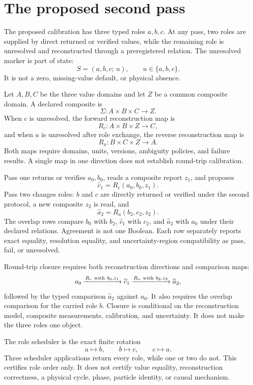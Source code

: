 \section{The proposed second pass}

The proposed calibration has three typed roles \(a,b,c\).  At any pass, two roles are supplied by direct returned or
verified values, while the remaining role is unresolved and reconstructed through a preregistered relation.  The
unresolved marker is part of state:
\[
                         S=(a,b,c;\,u),\qquad u\in\{a,b,c\}.
\]
It is not a zero, missing-value default, or physical absence.

Let \(A,B,C\) be the three value domains and let \(Z\) be a common composite domain.  A declared composite is
\[
                         \Sigma:A\times B\times C\to Z.
\]
When \(c\) is unresolved, the forward reconstruction map is
\[
                         R_c:A\times B\times Z\to C,
\]
and when \(a\) is unresolved after role exchange, the reverse reconstruction map is
\[
                         R_a:B\times C\times Z\to A.
\]
Both maps require domains, units, versions, ambiguity policies, and failure results.  A single map in one direction
does not establish round-trip calibration.

Pass one returns or verifies \(a_0,b_0\), reads a composite report \(z_1\), and proposes
\[
                         \widehat c_1=R_c(a_0,b_0,z_1).
\]
Pass two changes roles: \(b\) and \(c\) are directly returned or verified under the second protocol, a new composite
\(z_2\) is read, and
\[
                         \widehat a_2=R_a(b_2,c_2,z_2).
\]
The overlap rows compare \(b_0\) with \(b_2\), \(\widehat c_1\) with \(c_2\), and \(\widehat a_2\) with \(a_0\) under
their declared relations.  Agreement is not one Boolean.  Each row separately reports exact equality, resolution
equality, and uncertainty-region compatibility as pass, fail, or unresolved.

Round-trip closure requires both reconstruction directions and comparison maps:
\[
                         a_0\xrightarrow{R_c\ {\rm with}\ b_0,z_1}\widehat c_1
\xrightarrow{R_a\ {\rm with}\ b_2,z_2}\widehat a_2,
\]
followed by the typed comparison \(\widehat a_2\) against \(a_0\).  It also requires the overlap comparison for the
carried role \(b\).  Closure is conditional on the reconstruction model, composite measurements, calibration, and
uncertainty.  It does not make the three roles one object.

The role scheduler is the exact finite rotation
\[
                         a\mapsto b,\qquad b\mapsto c,\qquad c\mapsto a.
\]
Three scheduler applications return every role, while one or two do not.  This certifies role order only.  It does
not certify value equality, reconstruction correctness, a physical cycle, phase, particle identity, or causal
mechanism.

